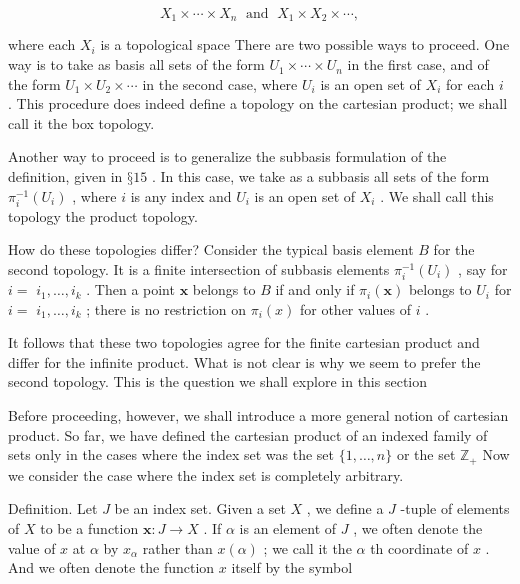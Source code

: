 \[
{X}_{1} \times  \cdots  \times  {X}_{n}\;\text{ and }\;{X}_{1} \times  {X}_{2} \times  \cdots ,
\]

where each \({X}_{i}\) is a topological space There are two possible ways to proceed. One way is to take as basis all sets of the form \({U}_{1} \times  \cdots  \times  {U}_{n}\) in the first case, and of the form \({U}_{1} \times  {U}_{2} \times  \cdots\) in the second case, where \({U}_{i}\) is an open set of \({X}_{i}\) for each \(i\) . This procedure does indeed define a topology on the cartesian product; we shall call it the box topology.

Another way to proceed is to generalize the subbasis formulation of the definition, given in \(§{15}\) . In this case, we take as a subbasis all sets of the form \({\pi }_{i}^{-1}\left( {U}_{i}\right)\) , where \(i\) is any index and \({U}_{i}\) is an open set of \({X}_{i}\) . We shall call this topology the product topology.

How do these topologies differ? Consider the typical basis element \(B\) for the second topology. It is a finite intersection of subbasis elements \({\pi }_{i}^{-1}\left( {U}_{i}\right)\) , say for \(i =\)  \({i}_{1},\ldots ,{i}_{k}\) . Then a point \(\mathbf{x}\) belongs to \(B\) if and only if \({\pi }_{i}\left( \mathbf{x}\right)\) belongs to \({U}_{i}\) for \(i =\)  \({i}_{1},\ldots ,{i}_{k}\) ; there is no restriction on \({\pi }_{i}\left( x\right)\) for other values of \(i\) .

It follows that these two topologies agree for the finite cartesian product and differ for the infinite product. What is not clear is why we seem to prefer the second topology. This is the question we shall explore in this section

Before proceeding, however, we shall introduce a more general notion of cartesian product. So far, we have defined the cartesian product of an indexed family of sets only in the cases where the index set was the set \(\{ 1,\ldots ,n\}\) or the set \({\mathbb{Z}}_{ + }\) Now we consider the case where the index set is completely arbitrary.

Definition. Let \(J\) be an index set. Given a set \(X\) , we define a \(J\) -tuple of elements of \(X\) to be a function \(\mathbf{x} : J \rightarrow  X\) . If \(\alpha\) is an element of \(J\) , we often denote the value of \(x\) at \(\alpha\) by \({x}_{\alpha }\) rather than \(x\left( \alpha \right)\) ; we call it the \(\alpha\) th coordinate of \(x\) . And we often denote the function \(x\) itself by the symbol

